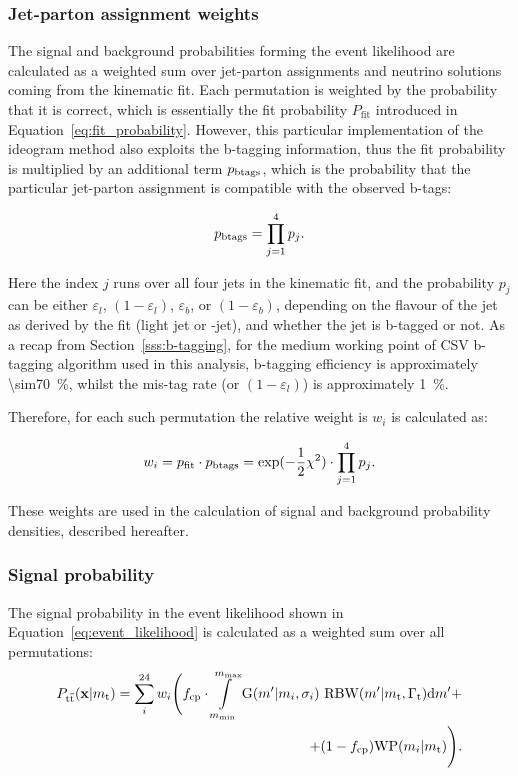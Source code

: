 \subsubsection*{Jet-parton assignment weights}
The signal and background probabilities forming the event likelihood are calculated as a weighted sum over jet-parton
assignments and neutrino solutions coming from the kinematic fit. Each permutation is weighted by the probability that
it is correct, which is essentially the fit probability $P_{\textrm{fit}}$ introduced in
Equation~\ref{eq:fit_probability}. However, this particular implementation of the ideogram method also exploits the
b-tagging information, thus the fit probability is multiplied by an additional term $p_{\rm btags}$, which is the
probability that the particular jet-parton assignment is compatible with the observed b-tags:

\begin{equation}
p_{\rm btags} = \prod_{j=1}^{4} p_{j}.
\end{equation}

Here the index $j$ runs over all four jets in the kinematic fit, and the probability $p_{j}$ can be either
$\varepsilon_{l}$, $(1 - \varepsilon_{l})$, $\varepsilon_{b}$, or $(1 - \varepsilon_{b})$, depending on the flavour of
the jet as derived by the fit (light jet or \cPqb-jet), and whether the jet is b-tagged or not. As a recap from
Section~\ref{sss:b-tagging}, for the medium working point of CSV b-tagging algorithm used in this analysis, b-tagging
efficiency is approximately \SI{\sim70}{\percent}, whilst the mis-tag rate (or $(1 - \varepsilon_{l})$) is approximately
\SI{1}{\percent}.

Therefore, for each such permutation the relative weight is $w_i$ is calculated as:

\begin{equation}
w_i = p_{\rm fit} \cdot p_{\rm btags} = \textrm{exp}(-\frac{1}{2}\chi^2) \cdot \prod_{j=1}^{4} p_{j}.
\label{eq:permutation_weight}
\end{equation}

These weights are used in the calculation of signal and background probability densities, described hereafter.

\subsubsection*{Signal probability}

The \ttbar signal probability in the event likelihood shown in Equation~\ref{eq:event_likelihood} is calculated as a
weighted sum over all permutations:
\begin{equation}
\begin{split}
P_{\mathrm{t}\overline{\mathrm{t}}}(\mathbf{x}|m_\mathrm{t}) = \sum_{i}^{24} w_{i} \Biggl( f_{\textrm{cp}} \cdot
\int\limits^{m_{\textrm{max}}}_{m_{\textrm{min}}} \textrm{G}(m'|m_{i},\sigma_{i}) ~\textrm{RBW}
(m'|m_\mathrm{t},\Gamma_{\textrm{t}}) \textrm{d}m' +  \\  + (1 -
f_{\textrm{cp}})\textrm{WP}(m_{i}|m_\mathrm{t}) \Biggr).
\end{split}
\end{equation}

